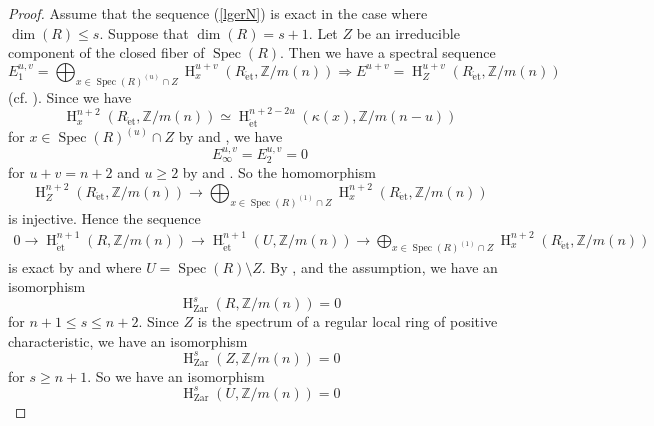 \documentclass{article}
\newcommand{\spec}{\operatorname{Spec}}
\newcommand{\et}{\mathrm{\acute{e}t}}
\newcommand{\Zar}{\mathrm{Zar}}
\newcommand{\HO}{\operatorname{H}}
\begin{document}
\begin{proof}
Assume that the sequence (\ref{lgerN}) is exact in the case where 
$\operatorname{dim}(R)\leq s$. Suppose that $\operatorname{dim}(R)=s+1$.
Let $Z$ be an irreducible component of the closed fiber of $\spec(R)$.
Then we have a spectral sequence
%
\begin{equation*}
E^{u, v}_{1}
=
\displaystyle
\bigoplus_{x\in \spec(R)^{(u)}\cap Z}
\HO^{u+v}_{x}(
R_{\et},
\mathbb{Z}/m(n)
)
\Rightarrow
E^{u+v}
=
\HO^{u+v}_{Z}(
R_{\et},
\mathbb{Z}/m(n)
)
\end{equation*}
%
(cf. \cite[The proof of Proposition 3.8]{Sak4}). Since we have
%
\begin{equation*}
\HO^{n+2}_{x}(
R_{\et}, 
\mathbb{Z}/m(n)
) 
\simeq 
\HO^{n+2-2u}_{\et}
(
\kappa(x),
\mathbb{Z}/m(n-u)
)
\end{equation*}
%
for 
$x\in\spec(R)^{(u)}\cap Z$ 
by \cite[p.540, Theorem 4.4.7]{SaP} and \cite{G},
we have
%
\begin{equation*}
E^{u, v}_{\infty}=E^{u, v}_{2}=0    
\end{equation*}
%
for $u+v=n+2$ and $u\geq 2$ by
\cite[p.600, Theorem 4.1]{Sh} and \cite[Corollary 2.2.2]{C-H-K}. 
So the homomorphism
%
\begin{equation*}
\HO^{n+2}_{Z}(
R_{\et},
\mathbb{Z}/m(n)
)
\to 
\displaystyle
\bigoplus_{x\in \spec(R)^{(1)}\cap Z}
\HO^{n+2}_{x}(
R_{\et},
\mathbb{Z}/m(n)
)
\end{equation*}
%
is injective.
Hence the sequence
%
\begin{align}\label{preex}
0\to  
\HO^{n+1}_{\et}(
R,
\mathbb{Z}/m(n)
)
\to
\HO^{n+1}_{\et}(
U,
\mathbb{Z}/m(n)
)
\to 
\displaystyle
\bigoplus_{x\in \spec(R)^{(1)}\cap Z}
\HO^{n+2}_{x}(
R_{\et},
\mathbb{Z}/m(n)
)
\end{align}
%
is exact 
by \cite[Proposition 4.2]{Sak4}
and \cite[p.35, Proposition 5]{SM19}
where $U=\spec(R)\setminus Z$. 
By \cite[Proposition 4.5]{Sak4}, 
\cite[p.37, Corollary 7]{SM19}
and the assumption, 
we have an isomorphism
%
\begin{equation*}
\HO^{s}_{\Zar}(R, \mathbb{Z}/m(n))=0    
\end{equation*}
%
for $n+1\leq s\leq n+2$.
Since $Z$ is the spectrum of a regular local ring of
positive characteristic, 
we have an  isomorphism
%
\begin{equation*}
\HO^{s}_{\Zar}(Z,
\mathbb{Z}/m(n)
)
=0
\end{equation*}
%
for $s \geq n+1$.
So we have an isomorphism
%
\begin{equation*}
\HO^{s}_{\Zar}(U, \mathbb{Z}/m(n))
=0

\end{equation*}
\end{proof}
\end{document}
